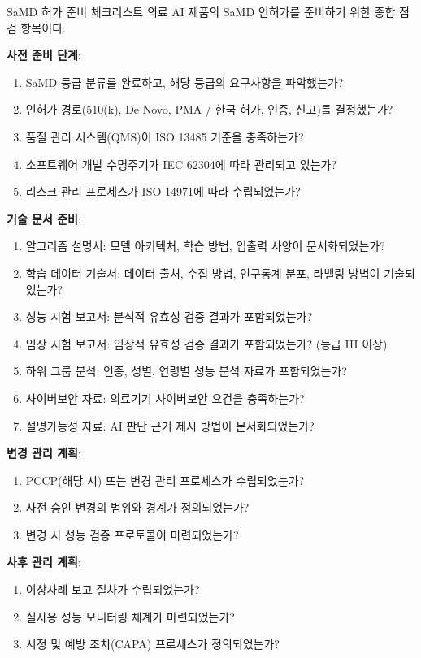 \begin{practicaltool}{SaMD 허가 준비 체크리스트}
의료 AI 제품의 SaMD 인허가를 준비하기 위한 종합 점검 항목이다.

\textbf{사전 준비 단계}:
\begin{enumerate}
 \item SaMD 등급 분류를 완료하고, 해당 등급의 요구사항을 파악했는가?
 \item 인허가 경로(510(k), De Novo, PMA / 한국 허가, 인증, 신고)를 결정했는가?
 \item 품질 관리 시스템(QMS)이 ISO 13485 기준을 충족하는가?
 \item 소프트웨어 개발 수명주기가 IEC 62304에 따라 관리되고 있는가?
 \item 리스크 관리 프로세스가 ISO 14971에 따라 수립되었는가?
\end{enumerate}

\textbf{기술 문서 준비}:
\begin{enumerate}
 \item 알고리즘 설명서: 모델 아키텍처, 학습 방법, 입출력 사양이 문서화되었는가?
 \item 학습 데이터 기술서: 데이터 출처, 수집 방법, 인구통계 분포, 라벨링 방법이 기술되었는가?
 \item 성능 시험 보고서: 분석적 유효성 검증 결과가 포함되었는가?
 \item 임상 시험 보고서: 임상적 유효성 검증 결과가 포함되었는가? (등급 III 이상)
 \item 하위 그룹 분석: 인종, 성별, 연령별 성능 분석 자료가 포함되었는가?
 \item 사이버보안 자료: 의료기기 사이버보안 요건을 충족하는가?
 \item 설명가능성 자료: AI 판단 근거 제시 방법이 문서화되었는가?
\end{enumerate}

\textbf{변경 관리 계획}:
\begin{enumerate}
 \item PCCP(해당 시) 또는 변경 관리 프로세스가 수립되었는가?
 \item 사전 승인 변경의 범위와 경계가 정의되었는가?
 \item 변경 시 성능 검증 프로토콜이 마련되었는가?
\end{enumerate}

\textbf{사후 관리 계획}:
\begin{enumerate}
 \item 이상사례 보고 절차가 수립되었는가?
 \item 실사용 성능 모니터링 체계가 마련되었는가?
 \item 시정 및 예방 조치(CAPA) 프로세스가 정의되었는가?
\end{enumerate}
\end{practicaltool}

